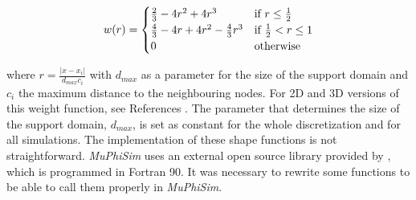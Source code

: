\documentclass[oneside,11pt,times]{book}
\begin{document}
\begin{minipage}{0.4\linewidth}
    \begin{equation}
        \begin{aligned}\label{403}
            \centering
            w(r) =
              \begin{cases}
               \frac{2}{3}-4r^2+4r^3 & \text{if } r \leq \frac{1}{2}\\
             \frac{4}{3}-4r+4r^2 - \frac{4}{3}r^3& \text{if } \frac{1}{2}< r \leq 1\\
               0       & \text{otherwise }
              \end{cases}
        \end{aligned}
    \end{equation}
\end{minipage}
\hspace{0.2cm}
\begin{minipage}{0.5\linewidth}
    \centering
    \label{fig:MMWeight}

\end{minipage}

where $r=\frac{|x-x_i|}{d_{max}c_i}$ with $d_{max}$ as a parameter for the size of the support domain and $c_i$ the maximum distance to the neighbouring nodes. For 2D and 3D versions of this weight function, see References \citep{nguyen:2008,ullah:2013}. The parameter that determines the size of the support domain, $d_{max}$, is set as constant for the whole discretization and for all simulations. The implementation of these shape functions is not straightforward. \textit{MuPhiSim} uses an external open source library provided by  \cite{sukumar:2007}, which is programmed in Fortran 90. It was necessary to rewrite some functions to be able to call them properly in \textit{MuPhiSim}. 
\end{document}
